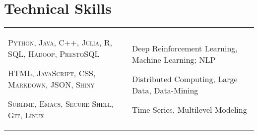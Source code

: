\documentclass[a4paper,10pt]{article}
\begin{document}
\section{Technical Skills}
\begin{supertabular}{p{8.65cm} p{8.65cm}}

	\begin{enumerate*}[label =$\circ$, itemjoin={\newline}]
																\item \small \textsc{Python, Java, C++, Julia, R, SQL, Hadoop, PrestoSQL}
																\item \small \textsc{HTML, JavaScript, CSS, Markdown, JSON, Shiny}
																\item \small \textsc{Sublime, Emacs, Secure Shell, Git, Linux}
																\end{enumerate*}


	& \begin{enumerate*}[label =$\circ$, itemjoin={\newline}]
                                \item \small Deep Reinforcement Learning, Machine Learning; NLP
                                \item \small Distributed Computing, Large Data, Data-Mining
                                \item \small Time Series, Multilevel Modeling \end{enumerate*}  \vspace{1mm} \\



\end{supertabular}



\end{document}
